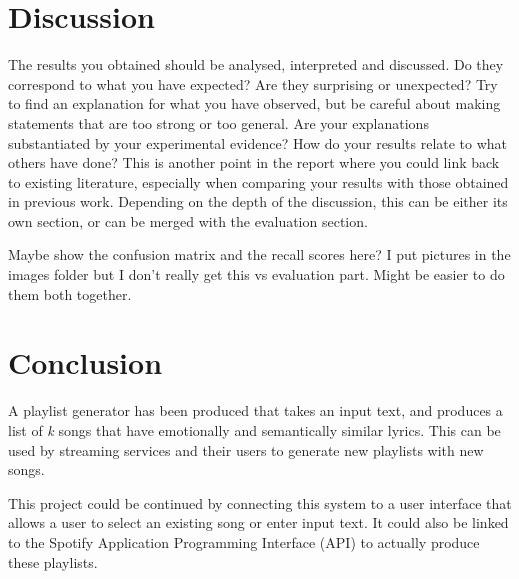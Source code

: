 \documentclass[11pt]{article}
\begin{document}
\section{Discussion}
The results you obtained should be analysed, interpreted and discussed. Do they correspond to what you have expected? Are they surprising or unexpected? Try to find an explanation for what you have observed, but be careful about making statements that are too strong or too general. Are your explanations substantiated by your experimental evidence? How do your results relate to what others have done? This is another point in the report where you could link back to existing literature, especially when comparing your results with those obtained in previous work. Depending on the depth of the discussion, this can be either its own section, or can be merged with the evaluation section.

Maybe show the confusion matrix and the recall scores here? I put pictures in the images folder but I don't really get this vs evaluation part. Might be easier to do them both together.



\section{Conclusion}

A playlist generator has been produced that takes an input text, and produces a list of \textit{k} songs that have emotionally and semantically similar lyrics. This can be used by streaming services and their users to generate new playlists with new songs.

This project could be continued by connecting this system to a user interface that allows a user to select an existing song or enter input text. It could also be linked to the Spotify Application Programming Interface (API) to actually produce these playlists.



\end{document}
